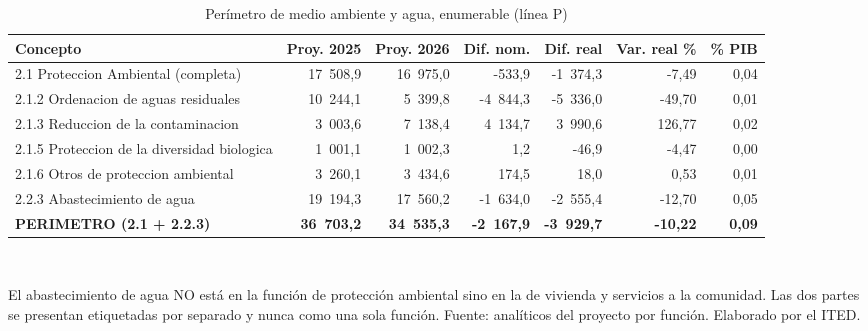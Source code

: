 \begin{table}[htbp]
\centering
\scriptsize
\caption{Perímetro de medio ambiente y agua, enumerable (línea P)}
\label{cua:C11_1}
\begin{tabular}{p{6.0cm}rrrrrr}
\toprule
\textbf{Concepto} & \textbf{Proy. 2025} & \textbf{Proy. 2026} & \textbf{Dif. nom.} & \textbf{Dif. real} & \textbf{Var. real \%} & \textbf{\% PIB} \\
\midrule
2.1 Proteccion Ambiental (completa) & 17 508,9 & 16 975,0 & -533,9 & -1 374,3 & -7,49 & 0,04 \\
  2.1.2 Ordenacion de aguas residuales & 10 244,1 & 5 399,8 & -4 844,3 & -5 336,0 & -49,70 & 0,01 \\
  2.1.3 Reduccion de la contaminacion & 3 003,6 & 7 138,4 & 4 134,7 & 3 990,6 & 126,77 & 0,02 \\
  2.1.5 Proteccion de la diversidad biologica & 1 001,1 & 1 002,3 & 1,2 & -46,9 & -4,47 & 0,00 \\
  2.1.6 Otros de proteccion ambiental & 3 260,1 & 3 434,6 & 174,5 & 18,0 & 0,53 & 0,01 \\
2.2.3 Abastecimiento de agua & 19 194,3 & 17 560,2 & -1 634,0 & -2 555,4 & -12,70 & 0,05 \\
\midrule
\textbf{PERIMETRO (2.1 + 2.2.3)} & \textbf{36 703,2} & \textbf{34 535,3} & \textbf{-2 167,9} & \textbf{-3 929,7} & \textbf{-10,22} & \textbf{0,09} \\
\bottomrule
\end{tabular}
\\[2pt]\begin{minipage}{0.92\textwidth}\scriptsize El abastecimiento de agua NO está en la función de protección ambiental sino en la de vivienda y servicios a la comunidad. Las dos partes se presentan etiquetadas por separado y nunca como una sola función. Fuente: analíticos del proyecto por función. Elaborado por el ITED.\end{minipage}
\end{table}
